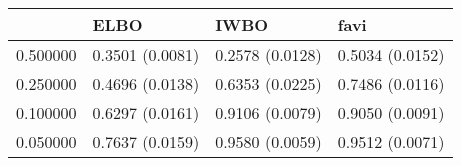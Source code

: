 \begin{tabular}{llll}
\toprule
 & ELBO & IWBO & favi \\
\midrule
0.500000 & 0.3501 (0.0081) & 0.2578 (0.0128) & 0.5034 (0.0152) \\
0.250000 & 0.4696 (0.0138) & 0.6353 (0.0225) & 0.7486 (0.0116) \\
0.100000 & 0.6297 (0.0161) & 0.9106 (0.0079) & 0.9050 (0.0091) \\
0.050000 & 0.7637 (0.0159) & 0.9580 (0.0059) & 0.9512 (0.0071) \\
\bottomrule
\end{tabular}
